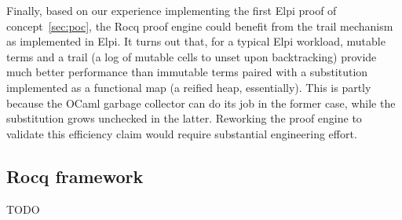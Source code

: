 \documentclass[a4paper, 11pt]{book}
\begin{document}
Finally, based on our experience implementing the first Elpi proof of
concept~\cref{sec:poc}, the Rocq proof engine could benefit from the trail
mechanism as implemented in Elpi. It turns out that, for a typical Elpi
workload, mutable terms and a trail (a log of mutable cells to unset upon
backtracking) provide much better performance than immutable terms paired with
a substitution implemented as a functional map (a reified heap, essentially).
This is partly because the OCaml garbage collector can do its job in the former
case, while the substitution grows unchecked in the latter. Reworking the proof
engine to validate this efficiency claim would require substantial engineering
effort.

\subsection{Rocq framework}

TODO

\printindex[concept]
\printbibliography[title={Our Bibliography}, keyword=me]
\printbibliography[title={Bibliography}, keyword=they]
\end{document}
